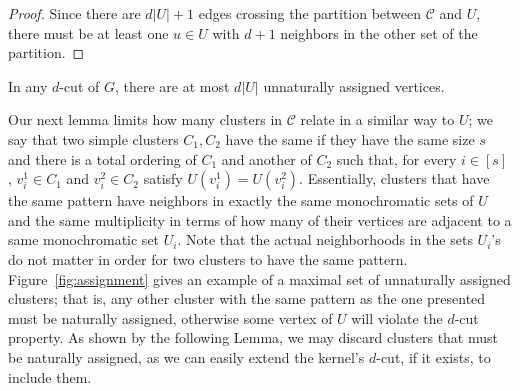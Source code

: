 \begin{proof}
    Since there are $d|U| + 1$ edges crossing the partition between $\mathcal{C}$ and $U$, there must be at least one $u \in U$ with $d+1$ neighbors in the other set of the partition.
\end{proof}

\begin{corollary}
    \label{cor:constrained_unnatural}
    In any $d$-cut of $G$, there are at most $d|U|$ unnaturally assigned vertices.
\end{corollary}


Our next lemma limits how many clusters in $\mathcal{C}$ relate in a similar way to $U$; we say that two simple clusters $C_1, C_2$ have the same  if they have the same size $s$ and there is a total ordering of $C_1$ and another of $C_2$ such that, for every $i \in [s]$, $v_i^1 \in C_1$ and $v_i^2 \in C_2$ satisfy $U(v_i^1) = U(v_i^2)$.
Essentially, clusters that have the same pattern have neighbors in exactly the same monochromatic sets of $U$ and the same multiplicity in terms of how many of their vertices are adjacent to a same monochromatic set $U_i$. Note that the actual neighborhoods in the sets $U_i$'s do not matter in order for two clusters to have the same pattern.
Figure~\ref{fig:assignment} gives an example of a maximal set of unnaturally assigned clusters; that is, any other cluster with the same pattern as the one presented must be naturally assigned, otherwise some vertex of $U$ will violate the $d$-cut property.
As shown by the following Lemma, we may discard clusters that must be naturally assigned, as we can easily extend the kernel's $d$-cut, if it exists, to include them.

